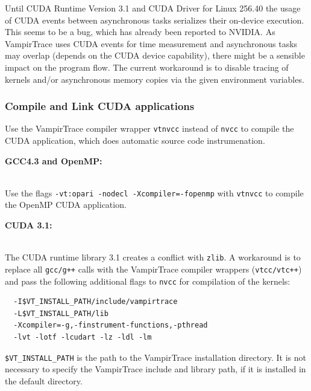 \documentclass[a4paper,twoside,12pt,BCOR12mm]{scrbook}
\begin{document}
  \noindent Until CUDA Runtime Version 3.1 and CUDA Driver for Linux 256.40 the usage of 
  CUDA events between asynchronous tasks serializes their on-device execution. 
  This seems to be a bug, which has already been reported to NVIDIA. 
  As VampirTrace uses CUDA events for time measurement and asynchronous tasks 
  may overlap (depends on the CUDA device capability), there might be a sensible 
  impact on the program flow. 
  The current workaround is to disable tracing of kernels and/or asynchronous 
  memory copies via the given environment variables.

  \subsubsection*{Compile and Link CUDA applications}
  Use the VampirTrace compiler wrapper \texttt{vtnvcc} instead of \texttt{nvcc} 
  to compile the CUDA application, which does automatic source code instrumenation.\smallskip\\

  \noindent \begin{small}\textbf{GCC4.3 and OpenMP:}\end{small}\\
  Use the flags \texttt{-vt:opari -nodecl -Xcompiler=-fopenmp} with \texttt{vtnvcc} 
  to compile the OpenMP CUDA application.\smallskip\\

  \noindent \begin{small}\textbf{CUDA 3.1:}\end{small}\\
  The CUDA runtime library 3.1 creates a conflict with \texttt{zlib}. 
  A workaround is to replace all 
  \texttt{gcc/g++} calls with the VampirTrace compiler wrappers 
  (\texttt{vtcc/vtc++}) and pass the following additional flags to 
  \texttt{nvcc} for compilation of the kernels:
  \begin{small}\begin{verbatim}
  -I$VT_INSTALL_PATH/include/vampirtrace
  -L$VT_INSTALL_PATH/lib 
  -Xcompiler=-g,-finstrument-functions,-pthread
  -lvt -lotf -lcudart -lz -ldl -lm
  \end{verbatim}\end{small}
  \begin{footnotesize}
  \texttt{\$VT\_INSTALL\_PATH} is the path to the VampirTrace installation 
  directory. It is not necessary to specify the VampirTrace include and library 
  path, if it is installed in the default directory.\\
  \end{footnotesize}
\end{document}
